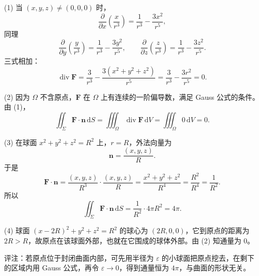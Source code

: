 (1) 当 $(x,y,z)\ne(0,0,0)$ 时，
\[
\frac{\partial}{\partial x}\left(\frac{x}{r^3}\right)
=\frac{1}{r^3}-\frac{3x^2}{r^5},
\]
同理
\[
\frac{\partial}{\partial y}\left(\frac{y}{r^3}\right)
=\frac{1}{r^3}-\frac{3y^2}{r^5},\qquad
\frac{\partial}{\partial z}\left(\frac{z}{r^3}\right)
=\frac{1}{r^3}-\frac{3z^2}{r^5}.
\]
三式相加：
\[
\operatorname{div}\mathbf F
=\frac{3}{r^3}-\frac{3(x^2+y^2+z^2)}{r^5}
=\frac{3}{r^3}-\frac{3r^2}{r^5}
=0.
\]

(2) 因为 $\Omega$ 不含原点，$\mathbf F$ 在 $\Omega$ 上有连续的一阶偏导数，满足 Gauss 公式的条件。由 (1)，
\[
\iint_\Sigma \mathbf F\cdot\mathbf n\,\mathrm{d}S
=\iiint_\Omega \operatorname{div}\mathbf F\,\mathrm{d}V
=\iiint_\Omega 0\,\mathrm{d}V=0.
\]

(3) 在球面 $x^2+y^2+z^2=R^2$ 上，$r=R$，外法向量为
\[
\mathbf n=\frac{(x,y,z)}{R}.
\]
于是
\[
\mathbf F\cdot\mathbf n
=\frac{(x,y,z)}{R^3}\cdot\frac{(x,y,z)}{R}
=\frac{x^2+y^2+z^2}{R^4}
=\frac{R^2}{R^4}
=\frac{1}{R^2}.
\]
所以
\[
\iint_\Sigma \mathbf F\cdot\mathbf n\,\mathrm{d}S
=\frac{1}{R^2}\cdot 4\pi R^2
=4\pi.
\]

(4) 球面 $(x-2R)^2+y^2+z^2=R^2$ 的球心为 $(2R,0,0)$，它到原点的距离为 $2R>R$，故原点在该球面外部，也就在它围成的球体外部。由 (2) 知通量为 $0$。

评注：若原点位于封闭曲面内部，可先用半径为 $\varepsilon$ 的小球面把原点挖去，在剩下的区域内用 Gauss 公式，再令 $\varepsilon\to0$，得到通量恒为 $4\pi$，与曲面的形状无关。


\else \answerarea[10] \fi%
